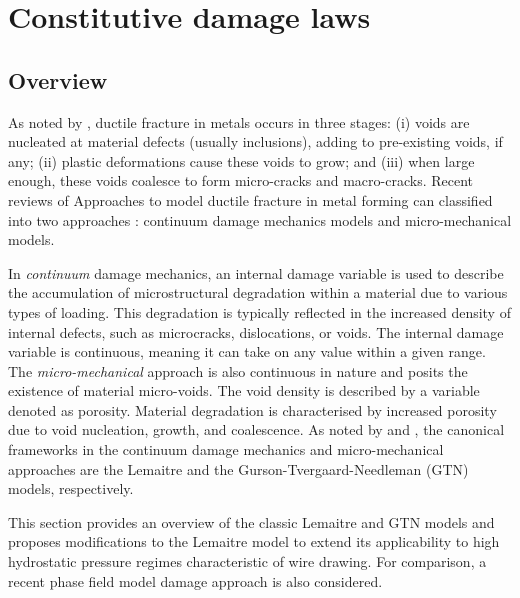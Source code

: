 \documentclass[sn-mathphys,Numbered,draft]{sn-jnl}%
\begin{document}
\section{Constitutive damage laws} \label{sec:constitutive_laws}


\subsection{Overview}

As noted by \citet{garrison_ductile_1987}, ductile fracture in metals occurs in three stages: (i) voids are nucleated at material defects (usually inclusions), adding to pre-existing voids, if any; (ii) plastic deformations cause these voids to grow; and (iii) when large enough, these voids coalesce to form micro-cracks and macro-cracks.
Recent reviews of 
Approaches to model ductile fracture in metal forming can classified into two approaches \citep{cao_models_2017, tekkaya_damage_2020}: continuum damage mechanics models and micro-mechanical models.

In \emph{continuum} damage mechanics, an internal damage variable is used to describe the accumulation of microstructural degradation within a material due to various types of loading.
This degradation is typically reflected in the increased density of internal defects, such as microcracks, dislocations, or voids.
The internal damage variable is continuous, meaning it can take on any value within a given range.
The \emph{micro-mechanical} approach is also continuous in nature and posits the existence of material micro-voids.
The void density is described by a variable denoted as porosity.
Material degradation is characterised by increased porosity due to void nucleation, growth, and coalescence.
As noted by \citet{besson_continuum_2010, cao_models_2017} and \citet{tekkaya_damage_2020}, the canonical frameworks in the continuum damage mechanics and micro-mechanical approaches are the Lemaitre \cite{lemaitre_continuous_1985,lemaitre_engineering_2005} and the Gurson-Tvergaard-Needleman (GTN) \cite{gurson_continuum_1977,tvergaard_analysis_1984} models, respectively.

This section provides an overview of the classic Lemaitre and GTN models and proposes modifications to the Lemaitre model to extend its applicability to high hydrostatic pressure regimes characteristic of wire drawing.
For comparison, a recent phase field model damage approach is also considered.
\end{document}
